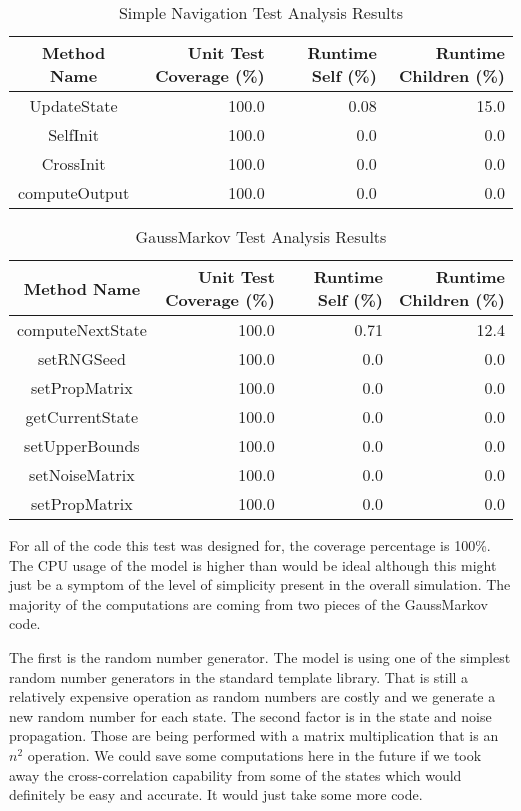 \begin{table}[htbp]
    \caption{Simple Navigation Test Analysis Results}
   \label{tab:cov_met}
        \centering \fontsize{10}{10}\selectfont
   \begin{tabular}{c | r | r | r} %
      \hline
      Method Name    & Unit Test Coverage (\%) & Runtime Self (\%) & Runtime Children (\%) \\
      \hline
      UpdateState & 100.0 & 0.08 & 15.0 \\
      SelfInit & 100.0 & 0.0 & 0.0 \\
      CrossInit & 100.0 & 0.0 & 0.0 \\
      computeOutput & 100.0 & 0.0 & 0.0 \\
      \hline
   \end{tabular}
\end{table}

\begin{table}[htbp]
    \caption{GaussMarkov Test Analysis Results}
   \label{tab:cov_met2}
        \centering \fontsize{10}{10}\selectfont
   \begin{tabular}{c | r | r | r} %
      \hline
      Method Name    & Unit Test Coverage (\%) & Runtime Self (\%) & Runtime Children (\%) \\
      \hline
      computeNextState & 100.0 & 0.71 & 12.4 \\
      setRNGSeed & 100.0 & 0.0 & 0.0 \\
      setPropMatrix & 100.0 & 0.0 & 0.0 \\
      getCurrentState & 100.0 & 0.0 & 0.0 \\
      setUpperBounds & 100.0 & 0.0 & 0.0 \\
      setNoiseMatrix & 100.0 & 0.0 & 0.0 \\
      setPropMatrix & 100.0 & 0.0 & 0.0 \\
      \hline
   \end{tabular}
\end{table}
For all of the code this test was designed for, the coverage percentage is 
100\%.  The CPU usage of the model is higher than would be ideal although this 
might just be a symptom of the level of simplicity present in the overall 
simulation.  The majority of the computations are coming from two pieces of the 
GaussMarkov code.  

The first is the random number generator.  The model is using 
one of the simplest random number generators in the standard template library.  
That is still a relatively expensive operation as random numbers are costly and 
we generate a new random number for each state.  The second factor is in the 
state and noise propagation.  Those are being performed with a matrix 
multiplication that is an $n^2$ operation.  We could save some computations 
here in the future if we took away the cross-correlation capability from some 
of the states which would definitely be easy and accurate.  It would just take 
some more code.
